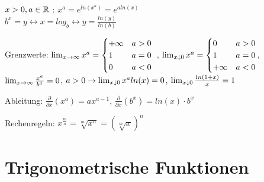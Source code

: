 \begin{definition}
 $\medspace$	\\ $x > 0, a \in \mathbb{R}$ : $x^a = e^{ln(x^a)} = e^{a ln(x)}$ \\ $b^x = y \leftrightarrow x = log_b \leftrightarrow y = \frac{ln (y)}{ln(b)}$
	\begin{description} [noitemsep]
		\item Grenzwerte: $\lim_{x \rightarrow \infty} x^a = \begin{cases}
		+ \infty & a > 0 \\ 
		1        & a = 0  \\
		0        & a < 0
		\end{cases} \medspace \medspace $,
		$\lim_{x \downarrow 0} x^a = \begin{cases}
		0        & a > 0 \\ 
		1        & a = 0  \\
		+ \infty & a < 0
		\end{cases}$,\\
		 $\lim_{x \rightarrow \infty} \frac{x^a}{b^x} = 0$, $a > 0 \rightarrow \lim_{x \downarrow 0} x^a ln(x) = 0$, $\lim_{x \downarrow 0} \frac{ln(1+x)}{x} = 1$
		\item Ableitung: $\frac{\partial}{\partial x} (x^a) = a x^{a - 1}$, $\frac{\partial}{\partial x}(b^x) = ln(x) \cdot b^x$
		\item Rechenregeln: $x^{\frac{m}{n}} = \sqrt[m]{x^n} = (\sqrt[m]{x})^n$
	\end{description}
\end{definition}

\section{Trigonometrische Funktionen}

